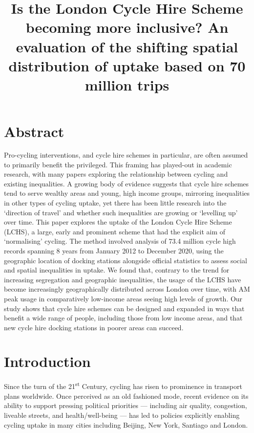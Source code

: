 \documentclass[
]{article}
\title{Is the London Cycle Hire Scheme becoming more inclusive? An evaluation of the shifting spatial distribution of uptake based on 70 million trips}
\author{}
\date{\vspace{-2.5em}}
\begin{document}
\maketitle

{
\setcounter{tocdepth}{2}
\tableofcontents
}
\hypertarget{abstract}{%
\section*{Abstract}\label{abstract}}

Pro-cycling interventions, and cycle hire schemes in particular, are often assumed to primarily benefit the privileged.
This framing has played-out in academic research, with many papers exploring the relationship between cycling and existing inequalities.
A growing body of evidence suggests that cycle hire schemes tend to serve wealthy areas and young, high income groups, mirroring inequalities in other types of cycling uptake, yet there has been little research into the `direction of travel' and whether such inequalities are growing or `levelling up' over time.
This paper explores the uptake of the London Cycle Hire Scheme (LCHS), a large, early and prominent scheme that had the explicit aim of `normalising' cycling.
The method involved analysis of 73.4 million cycle high records spanning 8 years from January 2012 to December 2020, using the geographic location of docking stations alongside official statistics to assess social and spatial inequalities in uptake.
We found that, contrary to the trend for increasing segregation and geographic inequalities, the usage of the LCHS have become increasingly geographically distributed across London over time, with AM peak usage in comparatively low-income areas seeing high levels of growth.
Our study shows that cycle hire schemes can be designed and expanded in ways that benefit a wide range of people, including those from low income areas, and that new cycle hire docking stations in poorer areas can succeed.

\hypertarget{introduction}{%
\section{Introduction}\label{introduction}}

Since the turn of the 21\textsuperscript{st} Century, cycling has risen to prominence in transport plans worldwide.
Once perceived as an old fashioned mode, recent evidence on its ability to support pressing political priorities --- including air quality, congestion, liveable streets, and health/well-being --- has led to policies explicitly enabling cycling uptake in many cities including Beijing, New York, Santiago and London.
\end{document}
